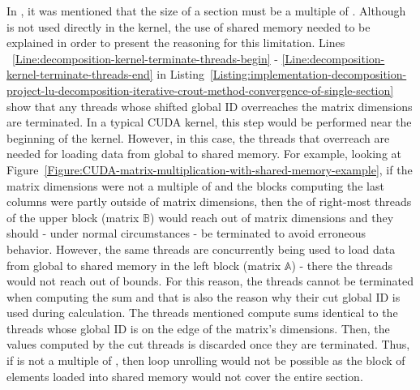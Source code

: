 In \textit{}, it was mentioned that the size of a section must be a multiple of . Although  is not used directly in the kernel, the use of shared memory needed to be explained in order to present the reasoning for this limitation. Lines ~\ref{Line:decomposition-kernel-terminate-threads-begin} - \ref{Line:decomposition-kernel-terminate-threads-end} in Listing~\ref{Listing:implementation-decomposition-project-lu-decomposition-iterative-crout-method-convergence-of-single-section} show that any threads whose shifted global ID overreaches the matrix dimensions are terminated. In a typical CUDA kernel, this step would be performed near the beginning of the kernel. However, in this case, the threads that overreach are needed for loading data from global to shared memory. For example, looking at Figure~\ref{Figure:CUDA-matrix-multiplication-with-shared-memory-example}, if the matrix dimensions were not a multiple of  and the blocks computing the last columns were partly outside of matrix dimensions, then the of right-most threads of the upper block (matrix $ \mathbb{B} $) would reach out of matrix dimensions and they should - under normal circumstances - be terminated to avoid erroneous behavior. However, the same threads are concurrently being used to load data from global to shared memory in the left block (matrix $ \mathbb{A} $) - there the threads would not reach out of bounds. For this reason, the threads cannot be terminated when computing the sum and that is also the reason why their cut global ID is used during calculation. The threads mentioned compute sums identical to the threads whose global ID is on the edge of the matrix's dimensions. Then, the values computed by the cut threads is discarded once they are terminated. Thus, if  is not a multiple of , then loop unrolling would not be possible as the block of elements loaded into shared memory would not cover the entire section.


